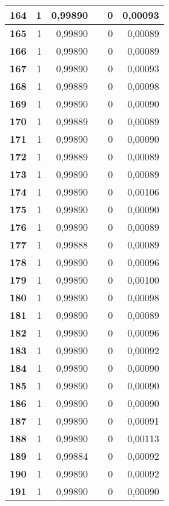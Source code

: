 \begin{longtable}{|r|r|r|l|r|r|}
\textbf{164} & 1 & 0,99890 &  & 0 & 0,00093 \\ \hline
\textbf{165} & 1 & 0,99890 &  & 0 & 0,00089 \\ \hline
\textbf{166} & 1 & 0,99890 &  & 0 & 0,00089 \\ \hline
\textbf{167} & 1 & 0,99890 &  & 0 & 0,00093 \\ \hline
\textbf{168} & 1 & 0,99889 &  & 0 & 0,00098 \\ \hline
\textbf{169} & 1 & 0,99890 &  & 0 & 0,00090 \\ \hline
\textbf{170} & 1 & 0,99889 &  & 0 & 0,00089 \\ \hline
\textbf{171} & 1 & 0,99890 &  & 0 & 0,00090 \\ \hline
\textbf{172} & 1 & 0,99889 &  & 0 & 0,00089 \\ \hline
\textbf{173} & 1 & 0,99890 &  & 0 & 0,00089 \\ \hline
\textbf{174} & 1 & 0,99890 &  & 0 & 0,00106 \\ \hline
\textbf{175} & 1 & 0,99890 &  & 0 & 0,00090 \\ \hline
\textbf{176} & 1 & 0,99890 &  & 0 & 0,00089 \\ \hline
\textbf{177} & 1 & 0,99888 &  & 0 & 0,00089 \\ \hline
\textbf{178} & 1 & 0,99890 &  & 0 & 0,00096 \\ \hline
\textbf{179} & 1 & 0,99890 &  & 0 & 0,00100 \\ \hline
\textbf{180} & 1 & 0,99890 &  & 0 & 0,00098 \\ \hline
\textbf{181} & 1 & 0,99890 &  & 0 & 0,00089 \\ \hline
\textbf{182} & 1 & 0,99890 &  & 0 & 0,00096 \\ \hline
\textbf{183} & 1 & 0,99890 &  & 0 & 0,00092 \\ \hline
\textbf{184} & 1 & 0,99890 &  & 0 & 0,00090 \\ \hline
\textbf{185} & 1 & 0,99890 &  & 0 & 0,00090 \\ \hline
\textbf{186} & 1 & 0,99890 &  & 0 & 0,00090 \\ \hline
\textbf{187} & 1 & 0,99890 &  & 0 & 0,00091 \\ \hline
\textbf{188} & 1 & 0,99890 &  & 0 & 0,00113 \\ \hline
\textbf{189} & 1 & 0,99884 &  & 0 & 0,00092 \\ \hline
\textbf{190} & 1 & 0,99890 &  & 0 & 0,00092 \\ \hline
\textbf{191} & 1 & 0,99890 &  & 0 & 0,00090 \\ \hline

\end{longtable}
